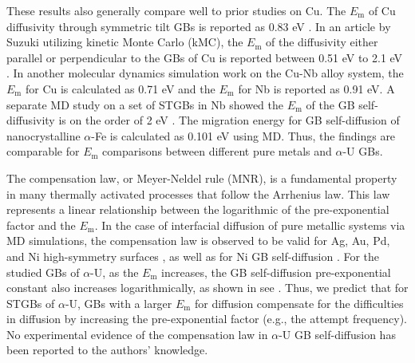 \documentclass[review]{elsarticle}
\begin{document}
These results also generally compare well to prior studies on Cu. The $E_{\mathrm{m}}$ of Cu diffusivity through symmetric tilt GBs is reported as 0.83 eV \cite{AginCu}.
In an article by Suzuki \cite{Suzuki2003} utilizing kinetic Monte Carlo (kMC), the $E_{\mathrm{m}}$ of the diffusivity either parallel or perpendicular to the GBs of Cu is reported between 0.51 eV to 2.1 eV \cite{Suzuki2003}. In another molecular dynamics simulation work on the Cu-Nb alloy system, the $E_{\mathrm{m}}$ for Cu is calculated as 0.71 eV and the $E_{\mathrm{m}}$ for Nb is reported as 0.91 eV\cite{cu_nb}. A separate MD study on a set of STGBs in Nb showed the $E_{\mathrm{m}}$ of the GB self-diffusivity is on the order of 2 eV \cite{Popov2022}. The migration energy for GB self-diffusion of nanocrystalline $\alpha$-Fe \cite{MOHAMMADZADEH201756} is calculated as 0.101 eV using MD. Thus, the findings are comparable for $E_{\mathrm{m}}$ comparisons between different pure metals and $\alpha$-U GBs.

The compensation law, or Meyer-Neldel rule (MNR), is a fundamental property in many thermally activated processes that follow the Arrhenius law. This law represents a linear relationship between the logarithmic of the pre-exponential factor and the $E_{\mathrm{m}}$. In the case of interfacial diffusion of pure metallic systems via MD simulations, the compensation law is observed to be valid for Ag, Au, Pd, and Ni high-symmetry surfaces \cite{compansation}, as well as for Ni GB self-diffusion \cite{Mendelev2005}. For the studied GBs of $\alpha$-U, as the $E_{\mathrm{m}}$ increases, the GB self-diffusion pre-exponential constant also increases logarithmically, as shown in see . Thus, we predict that for STGBs of $\alpha$-U, GBs with a larger $E_{\mathrm{m}}$ for diffusion compensate for the difficulties in diffusion by increasing the pre-exponential factor (e.g., the attempt frequency). No experimental evidence of the compensation law in $\alpha$-U GB self-diffusion has been reported to the authors' knowledge.

\end{document}
